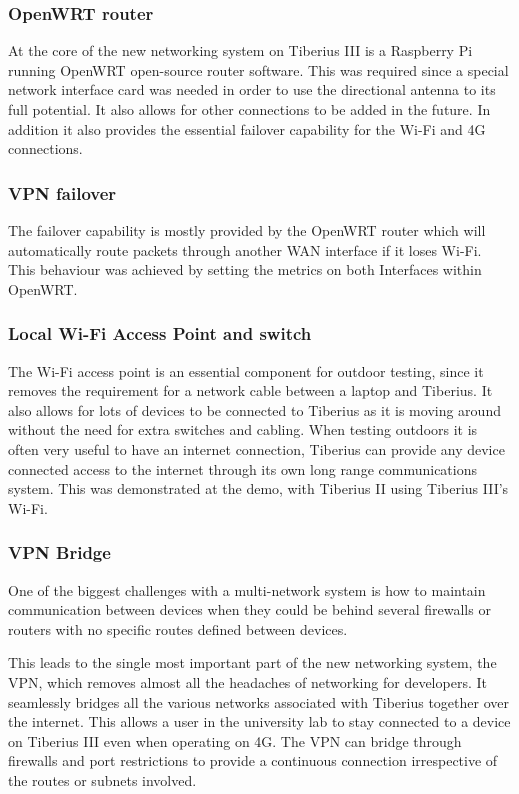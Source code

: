 \subsubsection{OpenWRT router}
At the core of the new networking system on Tiberius III is a Raspberry Pi running OpenWRT open-source router software. This was required since a special network interface card was needed in order to use the directional antenna to its full potential. It also allows for other connections to be added in the future. In addition it also provides the essential failover capability for the Wi-Fi and 4G connections.

\subsubsection{VPN failover}
The failover capability is mostly provided by the OpenWRT router which will automatically route packets through another WAN interface if it loses Wi-Fi. This behaviour was achieved by setting the metrics on both Interfaces within OpenWRT.

\subsubsection{Local Wi-Fi Access Point and switch}
The Wi-Fi access point is an essential component for outdoor testing, since it removes the requirement for a network cable between a laptop and Tiberius. It also allows for lots of devices to be connected to Tiberius as it is moving around without the need for extra switches and cabling. When testing outdoors it is often very useful to have an internet connection, Tiberius can  provide any device connected access to the internet through its own long range communications system. This was demonstrated at the demo, with Tiberius II using Tiberius III's Wi-Fi.

\subsubsection{VPN Bridge} 
One of the biggest challenges with a multi-network system is how to maintain communication between devices when they could be behind several firewalls or routers with no specific routes defined between devices.

This leads to the single most important part of the new networking system, the VPN, which removes almost all the headaches of networking for developers. It seamlessly bridges all the various networks associated with Tiberius together over the internet. This allows a user in the university lab to stay connected to a device on Tiberius III even when operating on 4G. The VPN can bridge through firewalls and port restrictions to provide a continuous connection irrespective of the routes or subnets involved.

